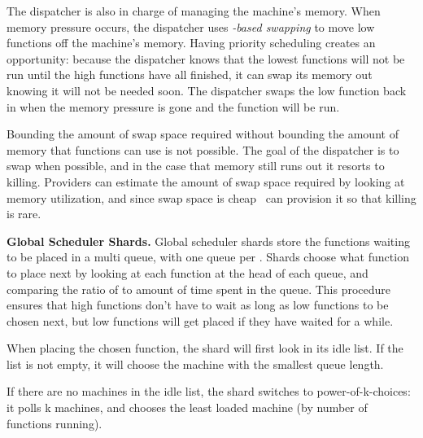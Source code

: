 The dispatcher is also in charge of managing the machine's memory. When memory
pressure occurs, the dispatcher uses \textit{\class{}-based swapping} to move
low \class{} functions off the machine's memory. Having priority scheduling
creates an opportunity: because the dispatcher knows that the lowest \class{}
functions will not be run until the high \class{} functions have all finished,
it can swap its memory out knowing it will not be needed soon. The dispatcher
swaps the low \class{} function back in when the memory pressure is gone and the
function will be run.

Bounding the amount of swap space required without bounding the amount of memory
that functions can use is not possible. The goal of the dispatcher is to swap
when possible, and in the case that memory still runs out it resorts to killing.
Providers can estimate the amount of swap space required by looking at memory
utilization, and since swap space is cheap~\cite{ssd-price} can provision it so
that killing is rare.

\textbf{Global Scheduler Shards.}
Global scheduler shards store the functions waiting to be placed in a multi
queue, with one queue per \priceclass{}. Shards choose what function to place
next by looking at each function at the head of each queue, and comparing the
ratio of \class{} to amount of time spent in the queue. This procedure ensures
that high \class{} functions don't have to wait as long as low \class{}
functions to be chosen next, but low \class{} functions will get placed if they
have waited for a while.

When placing the chosen function, the shard will first look in its idle list. If
the list is not empty, it will choose the machine with the smallest queue
length.

If there are no machines in the idle list, the shard switches to
power-of-k-choices: it polls k machines, and chooses the least loaded machine
(by number of functions running). 
